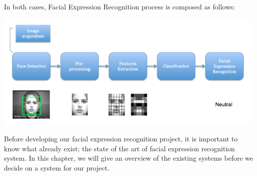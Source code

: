 In both cases, Facial Expression Recognition process is composed as follows:


\noindent \includegraphics[scale=0.6]{figures/facial_expression_recognition_process}

Before developing our facial expression recognition project, it is important to know what already exist; the state of the art of facial expression recognition system. In this chapter, we will give an overview of the existing systems before we decide on a system for our project.
